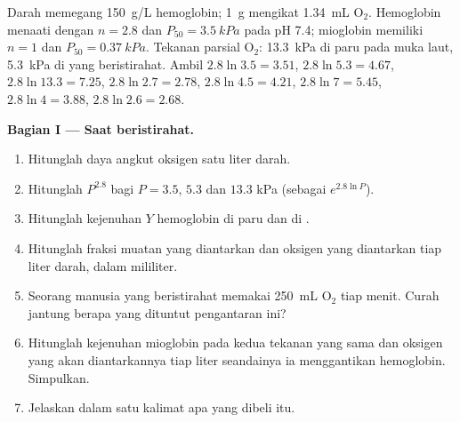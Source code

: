 \begin{problem}
\label{pb:b1:proteins:1}
Darah memegang \qty{150}{g/L} hemoglobin; \qty{1}{g} mengikat
\qty{1.34}{mL} $\mathrm{O_2}$. Hemoglobin menaati  dengan
$n = 2.8$ dan $P_{50} = \qty{3.5}{kPa}$ pada pH 7.4; mioglobin memiliki
$n = 1$ dan $P_{50} = \qty{0.37}{kPa}$. Tekanan parsial
$\mathrm{O_2}$: \qty{13.3}{kPa} di paru pada muka laut,
\qty{5.3}{kPa} di  yang beristirahat. Ambil $2.8\ln 3.5 = 3.51$,
$2.8\ln 5.3 = 4.67$, $2.8\ln 13.3 = 7.25$, $2.8\ln 2.7 = 2.78$,
$2.8\ln 4.5 = 4.21$, $2.8\ln 7 = 5.45$, $2.8\ln 4 = 3.88$,
$2.8\ln 2.6 = 2.68$.

\medskip
\noindent\textbf{Bagian I --- Saat beristirahat.}
\begin{enumerate}
  \item Hitunglah daya angkut oksigen satu liter darah.
  \item Hitunglah $P^{2.8}$ bagi $P = 3.5$, $5.3$ dan $13.3$ kPa
        (sebagai
        $e^{2.8\ln P}$).
  \item Hitunglah kejenuhan $Y$ hemoglobin di paru dan di .
  \item Hitunglah fraksi muatan yang diantarkan dan oksigen yang
        diantarkan tiap liter darah, dalam mililiter.
  \item Seorang manusia yang beristirahat memakai \qty{250}{mL}
        $\mathrm{O_2}$ tiap menit. Curah jantung berapa yang dituntut
        pengantaran ini?
  \item Hitunglah kejenuhan mioglobin pada kedua tekanan yang sama dan
        oksigen yang akan diantarkannya tiap liter seandainya ia
        menggantikan hemoglobin. Simpulkan.
  \item Jelaskan dalam satu kalimat apa yang dibeli  itu.
\end{enumerate}


\end{problem}
